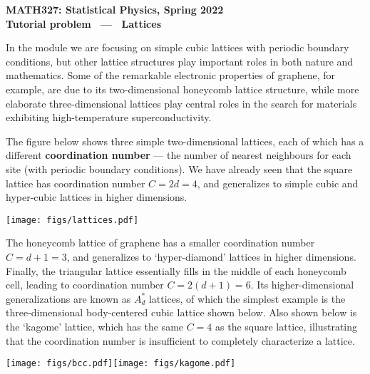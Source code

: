 \documentclass[12 pt]{article} %
\begin{document}
\newcommand{\thisunit}{MATH327 Tutorial (Lattice)}
\newcommand{\moddate}{Last modified 29 Apr.~2022}
\begin{center}
  {\Large \textbf{MATH327: Statistical Physics, Spring 2022}} \\[12 pt]
  {\Large \textbf{Tutorial problem \ --- \ Lattices}} \\[24 pt]
\end{center}

In the module we are focusing on simple cubic lattices with periodic boundary conditions, but other lattice structures play important roles in both nature and mathematics.
Some of the remarkable electronic properties of graphene, for example, are due to its two-dimensional honeycomb lattice structure, while more elaborate three-dimensional lattices play central roles in the search for materials exhibiting high-temperature superconductivity.

The figure below shows three simple two-dimensional lattices, each of which has a different \textbf{coordination number} --- the number of nearest neighbours for each site (with periodic boundary conditions). %
We have already seen that the square lattice has coordination number $C = 2d = 4$, and generalizes to simple cubic and hyper-cubic lattices in higher dimensions.

\begin{center}\texttt{[image: figs/lattices.pdf]}\end{center}

The honeycomb lattice of graphene has a smaller coordination number $C = d + 1 = 3$, and generalizes to `hyper-diamond' lattices in higher dimensions.
Finally, the triangular lattice essentially fills in the middle of each honeycomb cell, leading to coordination number $C = 2(d + 1) = 6$.
Its higher-dimensional generalizations are known as $A_d^*$ lattices, of which the simplest example is the three-dimensional body-centered cubic lattice shown below.
Also shown below is the `kagome' lattice, which has the same $C = 4$ as the square lattice, illustrating that the coordination number is insufficient to completely characterize a lattice.

\begin{center}\texttt{[image: figs/bcc.pdf]}\hspace{0.15\textwidth}\texttt{[image: figs/kagome.pdf]}\end{center}
\end{document}
